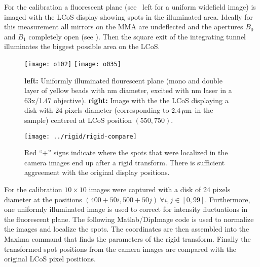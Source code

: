 For the calibration a fluorescent plane (see
~left for a uniform widefield image) is imaged
with the LCoS display showing spots in the illuminated area.  Ideally
for this measurement all mirrors on the MMA are undeflected and the
apertures $B_0$ and $B_1$ completely open (see
). Then the square exit of the integrating
tunnel illuminates the biggest possible area on the LCoS.

\begin{figure}[!hbt]
  \centering
  \texttt{[image: o102]}
  \texttt{[image: o035]}
  \caption{{\bf left:} Uniformly illuminated flourescent plane (mono
    and double layer of yellow beads with \unit[110]{nm} diameter,
    excited with \unit[473]{nm} laser in a 63x/1.47 objective). {\bf
      right:} Image with the the LCoS displaying a disk with 24 pixels
    diameter (corresponding to $\unit[2.4]{\mu m}$ in the sample)
    centered at LCoS position $(550,750)$.}
  \label{fig:rigid-pics}
\end{figure}


\begin{figure}[!hbt]
  \centering
  \texttt{[image: ../rigid/rigid-compare]}
  \caption{Red ``$+$'' signs indicate where the spots that were
    localized in the camera images end up after a rigid
    transform. There is sufficient aggreement with the original
    display positions.}
  \label{fig:rigid-compare}
\end{figure}

For the calibration $10\times10$ images were captured with a disk of
24 pixels diameter at the positions $(400+50i,500+50j)\ \forall i,j\in
[0,99]$. Furthermore, one uniformly illuminated image is used to
correct for intensity fluctuations in the fluorescent plane.  The
following Matlab/DipImage code is used to normalize the images and
localize the spots. The coordinates are then assembled into the Maxima
command that finds the parameters of the rigid transform. Finally the
transformed spot positions from the camera images are compared with
the original LCoS pixel positions.

